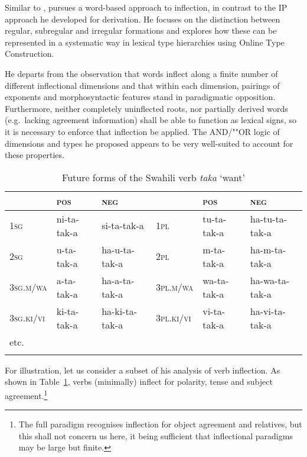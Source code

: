 \documentclass[output=paper
 	        ,biblatex
                ,babelshorthands
                ,newtxmath
                ,draftmode
                ,colorlinks, citecolor=brown
]{langscibook}
\begin{document}
Similar to \citet{Krieger:Nerbonne:93}, \citet{Koenig99} pursues a
word-based approach to inflection, in contrast to the IP approach he
developed for derivation. He focuses on the distinction between
regular, subregular and irregular formations and explores how these
can be represented in a systematic way in lexical type hierarchies
using Online Type Construction.

He departs from the observation that words  inflect along a finite number
of different inflectional dimensions and that within each dimension,
pairings of exponents and morphosyntactic features stand in
paradigmatic opposition. Furthermore, neither completely uninflected
roots, nor partially derived words (e.g.\ lacking agreement
information) shall be able to function as lexical signs, so it is
necessary to enforce that inflection be applied. The AND/""OR
logic of dimensions and types he proposed appears to be very
well-suited to account for these properties. 

\begin{table}
\setlength{\tabcolsep}{.3em}
\centering
\begin{tabular}{llllll}
\lsptoprule 
 & \textsc{pos} & \textsc{neg}     &             & \textsc{pos} & \textsc{neg}\\
\midrule 
\textsc{1sg}       & ni-{ta}-tak-{a} & {si}-{ta}-tak-{a}    & \textsc{1pl} & tu-{ta}-tak-{a}     & {ha}-tu-{ta}-tak-{a}\\
\textsc{2sg}       & u-{ta}-tak-{a}  & {ha}-u-{ta}-tak-{a}  & \textsc{2pl} & m-{ta}-tak-{a}      & {ha}-m-{ta}-tak-{a}\\
\textsc{3sg.m/wa}  & a-{ta}-tak-{a}  & {ha}-a-{ta}-tak-{a}  & \textsc{3pl.m/wa} & wa-{ta}-tak-{a} & {ha}-wa-{ta}-tak-{a}\\ 
\textsc{3sg.ki/vi} & ki-{ta}-tak-{a} & {ha}-ki-{ta}-tak-{a} & \textsc{3pl.ki/vi} & vi-{ta}-tak-{a} & {ha}-vi-{ta}-tak-{a}\\
etc. & &\\
\lspbottomrule
\end{tabular}
\caption{Future forms of the Swahili verb  \textit{taka} `want'}
\label{tab:SwahiliPast}
\end{table}


For illustration, let us consider a subset of his analysis of 
verb inflection. As shown in Table~\ref{tab:SwahiliPast}, 
verbs (minimally) inflect for polarity, tense and subject
agreement.\footnote{The full paradigm recognises inflection for object
agreement and relatives, but this shall not concern us here, it being
sufficient that inflectional paradigms may be large but finite.} 
\end{document}
